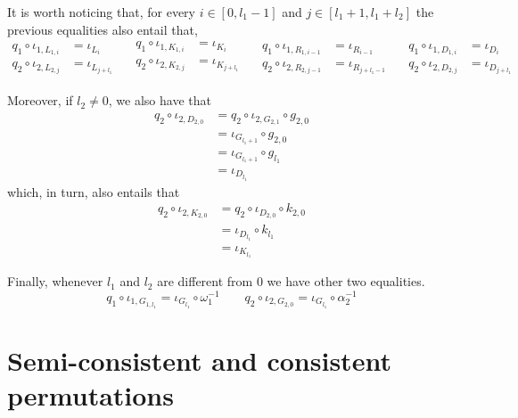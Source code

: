 \begin{remark}\label{rem:dett2}
	It is worth noticing that, for every $i\in [0,l_1-1]$ and $j\in [l_1+1, l_1+l_2]$ the previous equalities also entail that,
	\[\begin{split}q_1\circ \iota_{1, L_{1,i}}&=\iota_{L_{i}}\\q_2\circ \iota_{2, L_{2,j}}&=\iota_{L_{j+l_1}} 	
	\end{split} \quad 
	\begin{split}    	q_1\circ \iota_{1, K_{1,i}}&=\iota_{K_{i}} \\q_2\circ \iota_{2, K_{2,j}}&=\iota_{K_{j+l_1}}\\ \end{split}\quad 
	\begin{split}    	q_1\circ \iota_{1, R_{1,i-1}}&=\iota_{R_{i-1}} \\q_2\circ \iota_{2, R_{2,j-1}}&=\iota_{R_{j+l_1-1}}\end{split}\quad 
	\begin{split}    	q_1\circ \iota_{1, D_{1,i}}&=\iota_{D_{i}} \\q_2\circ \iota_{2, D_{2,j}}&=\iota_{D_{j+l_1}}\end{split}\]
	
	Moreover, if $l_2\neq 0$, we also have that
	\begin{align*} 
		q_2\circ \iota_{2, D_{2, 0}}&=q_2\circ \iota_{2, G_{2, 1}}\circ g_{2, 0}\\&=\iota_{G_{l_1+1}}\circ g_{2,0}\\&=\iota_{G_{l_1+1}}\circ g_{l_1}\\&=\iota_{D_{l_1}}
	\end{align*}
	which, in turn, also entails that
	\begin{align*}
		q_2\circ \iota_{2, K_{2, 0}}&=q_2\circ \iota_{D_{2, 0}}\circ k_{2, 0}\\&=\iota_{D_{l_1}}\circ k_{l_1}\\&=\iota_{K_{l_1}}
	\end{align*}
	
	Finally, whenever $l_1$ and $l_2$ are different from $0$ we have other two equalities.
	\[q_1\circ \iota_{1, G_{1, l_1}}=\iota_{ G_{l_1}}\circ \omega^{-1}_1 \qquad q_2\circ \iota_{2, G_{2, 0}}=\iota_{ G_{l_1}}\circ \alpha^{-1}_2\]
	
\end{remark}


\section{Semi-consistent and consistent permutations}
	
